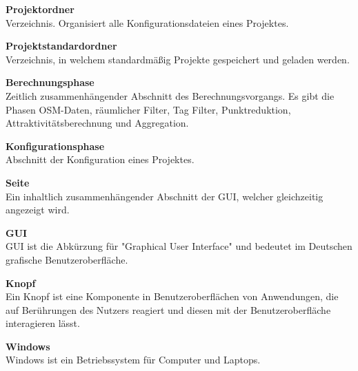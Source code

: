\documentclass[parskip=full]{scrartcl} %
\begin{document}
\textbf{Projektordner}\\
Verzeichnis. Organisiert alle Konfigurationsdateien eines Projektes.

\textbf{Projektstandardordner}\\
Verzeichnis, in welchem standardmäßig Projekte gespeichert und geladen werden.

\textbf{Berechnungsphase}\\
Zeitlich zusammenhängender Abschnitt des Berechnungsvorgangs. Es gibt die Phasen OSM-Daten, räumlicher Filter, Tag Filter, Punktreduktion, Attraktivitätsberechnung und Aggregation.

\textbf{Konfigurationsphase}\\
Abschnitt der Konfiguration eines Projektes.

\textbf{Seite}\\
Ein inhaltlich zusammenhängender Abschnitt der GUI, welcher gleichzeitig angezeigt wird.

\textbf{GUI}\\
GUI ist die Abkürzung für "Graphical User Interface" und bedeutet im Deutschen grafische Benutzeroberfläche.

\textbf{Knopf}\\
Ein Knopf ist eine Komponente in Benutzeroberflächen von Anwendungen, die auf Berührungen des Nutzers reagiert und diesen mit der Benutzeroberfläche interagieren lässt.

\textbf{Windows}\\
Windows ist ein Betriebssystem für Computer und Laptops.
\end{document}
